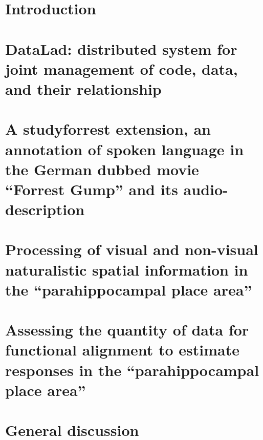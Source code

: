 \documentclass[english,12pt]{report}
\begin{document}
\begin{spacing}{1.5}
\chapter{Introduction}
\setcounter{page}{1}







\chapter{DataLad: distributed system for joint management of code, data, and
their relationship}






\chapter{A studyforrest extension, an annotation of spoken language in the
German dubbed movie ``Forrest Gump'' and its audio-description}






\chapter{Processing of visual and non-visual naturalistic spatial information in
the ``parahippocampal place area''}




\chapter{Assessing the quantity of data for functional alignment to estimate
    responses in the ``parahippocampal place area''}





\chapter{General discussion}


\end{spacing}
\end{document}
